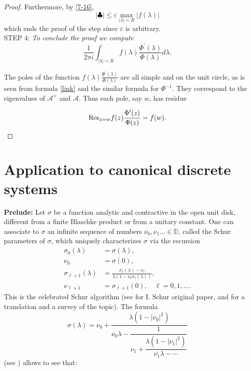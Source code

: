 \documentclass[12pt]{amsart}
\theoremstyle{definition}
\theoremstyle{remark}
\numberwithin{equation}{section}
\newcommand{\e}{\varepsilon}
\begin{document}
\begin{proof}
Furthermore, by \eqref{7-16},
\[
  |\clubsuit|\le\e \max_{|\lambda|=R}|f(\lambda)|
\]
which ends the proof of the step since $\e$ is arbitrary.\\


STEP 4: {\sl To conclude the proof we compute
  \begin{equation}
    \label{residue-567}
\frac{1}{2\pi i}\int_{|\lambda|=R}f(\lambda)\frac{\Phi^\prime(\lambda)}{\Phi(\lambda)}d\lambda.
    \end{equation}
}

The poles of the function $f(\lambda)\frac{\Phi^\prime(\lambda)}{\Phi(\lambda)}$ are all simple and on the unit circle, as is seen from formula \eqref{link} and the similar
formula for $\Phi^{-1}$. They correspond to the eigenvalues of $\mathcal A^\times$
and $\mathcal A$. Thus each pole, say $w$, has residue



\[
          {\rm Res}_{z=w}f(z)\frac{\Phi^\prime(z)}{\Phi(z)}=f(w).
        \]
        \end{proof}


          \section{Application to canonical discrete systems}
        \setcounter{equation}{0}
        \label{seccano}
        {\bf  Prelude:} Let ${\sigma}$ be a function analytic and contractive in the open unit disk, different from a finite Blaschke product or from a unitary constant.
        One can associate to ${\sigma}$ an infinite
        sequence of numbers $\nu_0,\nu_1\ldots\in\mathbb D$, called the Schur parameters of ${\sigma}$,  which uniquely characterizes ${\sigma}$ via the recursion
        \[
          \begin{split}
            {\sigma}_0(\lambda)&={\sigma}(\lambda),\\
            \nu_0&={\sigma}(0),\\
            {\sigma}_{\ell+1}(\lambda)&=\frac{{\sigma}_\ell(\lambda)-\nu_\ell}{\lambda(1-\overline{\nu_\ell} {\sigma}_\ell(\lambda))},\\
            \nu_{\ell+1}&=\sigma_{\ell+1}(0),\quad \ell=0,1,\ldots .
            \end{split}
          \]
          This is the celebrated Schur algorithm (see \cite{schur} for I. Schur original paper, and \cite{goh1} for a translation and a survey of the topic). The formula
          \[
            {\sigma}(\lambda)=\nu_0+\frac{\lambda(1-|\nu_0|^2)}{\overline{\nu_0}\lambda-
            \dfrac{1}{\nu_1+\dfrac{\lambda(1-|\nu_1|^2)}{\overline{\nu_1}\lambda-\cdots}}}
                \]
                (see \cite[theorem 77.1 p. 285]{wall}) allows to see that:
\end{document}
